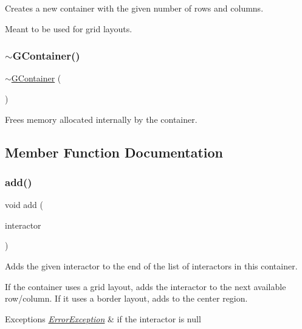 Creates a new container with the given number of rows and columns. 

Meant to be used for grid layouts. \mbox{\label{classGContainer_aa7f04c9e10de9145c56d123473ba013d}} 
\subsubsection{\texorpdfstring{$\sim$\+G\+Container()}{~GContainer()}}
{\footnotesize\ttfamily $\sim$\mbox{\hyperlink{classGContainer}{G\+Container}} (\begin{DoxyParamCaption}{ }\end{DoxyParamCaption})\hspace{0.3cm}{\ttfamily [virtual]}}



Frees memory allocated internally by the container. 



\subsection{Member Function Documentation}
\mbox{\label{classGContainer_a6f99b7c841256dbdc5acaafbbca4e685}} 
\subsubsection{\texorpdfstring{add()}{add()}\hspace{0.1cm}{\footnotesize\ttfamily [1/2]}}
{\footnotesize\ttfamily void add (\begin{DoxyParamCaption}\item[{\mbox{\hyperlink{classGInteractor}{G\+Interactor}} $\ast$}]{interactor }\end{DoxyParamCaption})\hspace{0.3cm}{\ttfamily [virtual]}}



Adds the given interactor to the end of the list of interactors in this container. 

If the container uses a grid layout, adds the interactor to the next available row/column. If it uses a border layout, adds to the center region. 
\begin{DoxyExceptions}{Exceptions}
{\em \mbox{\hyperlink{classErrorException}{Error\+Exception}}} & if the interactor is null \\
\hline
\end{DoxyExceptions}
\mbox{\label{classGContainer_a33b08fe5428ed634a658deab076099f7}} 
